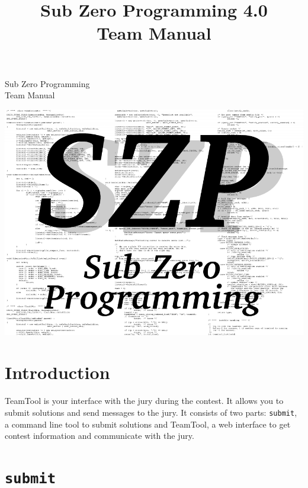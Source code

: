 \documentclass[a4paper]{artikel3}
\title{ Sub Zero Programming 4.0 \\ Team Manual }
\newcommand{\cmd}[1]{\texttt{#1}}
\begin{document}
\begin{titlepage}
\begin{center}

{\Huge Sub Zero Programming} \\

{\Huge Team Manual} \\
\vspace{5cm}

\includegraphics[width=160mm]{szplogo}

\end{center}
\end{titlepage}


\bigskip
\section{Introduction}

TeamTool is your interface with the jury during the contest. It allows you
to submit solutions and send messages to the jury. It consists of two parts:
\cmd{submit}, a command line tool to submit solutions and TeamTool, a web
interface to get contest information and communicate with the jury.

\section{\cmd{submit}}

\label{sec:submit}
\end{document}
